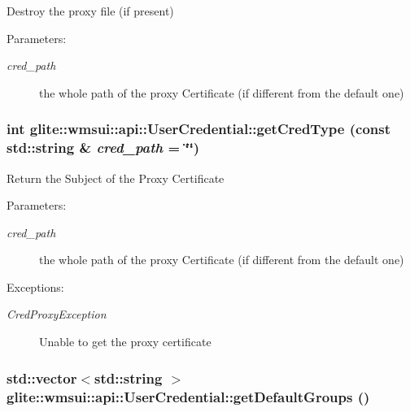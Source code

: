 Destroy the proxy file (if present) \begin{Desc}
\item[Parameters:]
\begin{description}
\item[{\em cred\_\-path}]the whole path of the proxy Certificate (if different from the default one)\end{description}
\end{Desc}
\hypertarget{classglite_1_1wmsui_1_1api_1_1UserCredential_a4}{
\subsubsection[getCredType]{\setlength{\rightskip}{0pt plus 5cm}int glite::wmsui::api::User\-Credential::get\-Cred\-Type (const std::string \& {\em cred\_\-path} = \char`\"{}\char`\"{})}}
\label{classglite_1_1wmsui_1_1api_1_1UserCredential_a4}


Return the Subject of the Proxy Certificate \begin{Desc}
\item[Parameters:]
\begin{description}
\item[{\em cred\_\-path}]the whole path of the proxy Certificate (if different from the default one) \end{description}
\end{Desc}
\begin{Desc}
\item[Exceptions:]
\begin{description}
\item[{\em Cred\-Proxy\-Exception}]Unable to get the proxy certificate\end{description}
\end{Desc}
\hypertarget{classglite_1_1wmsui_1_1api_1_1UserCredential_a12}{
\subsubsection[getDefaultGroups]{\setlength{\rightskip}{0pt plus 5cm}std::vector$<$std::string $>$ glite::wmsui::api::User\-Credential::get\-Default\-Groups ()}}
\label{classglite_1_1wmsui_1_1api_1_1UserCredential_a12}


